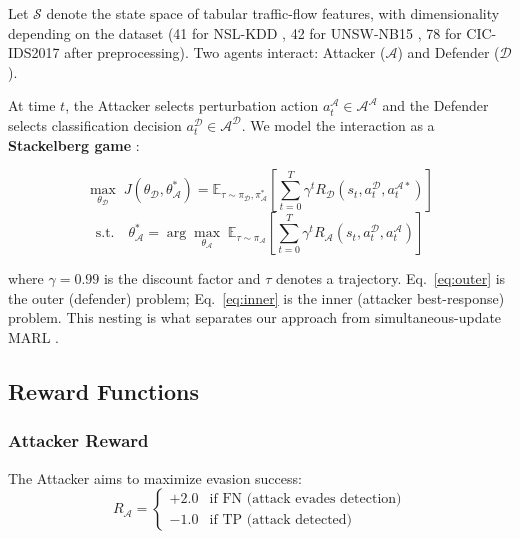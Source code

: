Let $\mathcal{S}$ denote the state space of tabular traffic-flow features, with dimensionality depending on the dataset (41 for NSL-KDD \cite{tavallaee2009nslkdd}, 42 for UNSW-NB15 \cite{moustafa2015unswnb15}, 78 for CIC-IDS2017 \cite{sharafaldin2018cicids2017} after preprocessing). Two agents interact: Attacker ($\mathcal{A}$) and Defender ($\mathcal{D}$).

At time $t$, the Attacker selects perturbation action $a^{\mathcal{A}}_t \in \mathcal{A}^{\mathcal{A}}$ and the Defender selects classification decision $a^{\mathcal{D}}_t \in \mathcal{A}^{\mathcal{D}}$. We model the interaction as a \textbf{Stackelberg game} \cite{vonStackelberg1952}:

\begin{equation}
    \max_{\theta_{\mathcal{D}}} \; J(\theta_{\mathcal{D}}, \theta_{\mathcal{A}}^*) = \mathbb{E}_{\tau \sim \pi_{\mathcal{D}}, \pi_{\mathcal{A}}^*} \left[ \sum_{t=0}^{T} \gamma^t R_{\mathcal{D}}(s_t, a^{\mathcal{D}}_t, a^{\mathcal{A}*}_t) \right]
    \label{eq:outer}
\end{equation}
\begin{equation}
    \text{s.t.} \quad \theta_{\mathcal{A}}^* = \arg\max_{\theta_{\mathcal{A}}} \; \mathbb{E}_{\tau \sim \pi_{\mathcal{A}}} \left[ \sum_{t=0}^{T} \gamma^t R_{\mathcal{A}}(s_t, a^{\mathcal{D}}_t, a^{\mathcal{A}}_t) \right]
    \label{eq:inner}
\end{equation}

where $\gamma = 0.99$ is the discount factor and $\tau$ denotes a trajectory. Eq.~\eqref{eq:outer} is the outer (defender) problem; Eq.~\eqref{eq:inner} is the inner (attacker best-response) problem. This nesting is what separates our approach from simultaneous-update MARL \cite{lowe2017maddpg, busoniu2008marl}.

\subsection{Reward Functions}

\subsubsection{Attacker Reward}
The Attacker aims to maximize evasion success:
\begin{equation}
    R_{\mathcal{A}} = \begin{cases}
        +2.0 & \text{if FN (attack evades detection)} \\
        -1.0 & \text{if TP (attack detected)}
    \end{cases}
    \label{eq:attacker_reward}
\end{equation}

